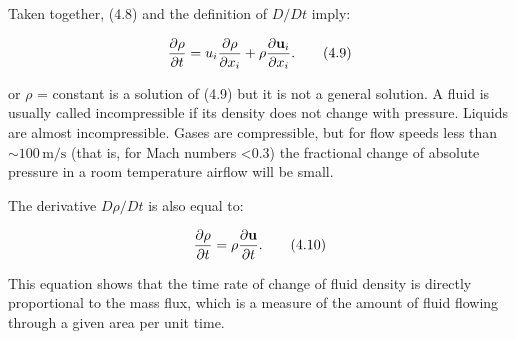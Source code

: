 \documentclass{article}
\begin{document}
Taken together, (4.8) and the definition of $D/Dt$ imply:

\[
\frac{\partial\rho}{\partial t} = u_i \frac{\partial\rho}{\partial x_i} + \rho \frac{\partial {\bf u}_i}{\partial x_i}. \tag{4.9}
\]

or $\rho$ = constant is a solution of (4.9) but it is not a general solution. A fluid is usually called incompressible if its density does not change with pressure. Liquids are almost incompressible. Gases are compressible, but for flow speeds less than $\sim\! 100 \, \mathrm{m/s}$ (that is, for Mach numbers <0.3) the fractional change of absolute pressure in a room temperature airflow will be small.

The derivative $D\rho/Dt$ is also equal to:

\[
\frac{\partial\rho}{\partial t} = \rho \frac{\partial {\bf u}}{\partial t}. \tag{4.10}
\]

This equation shows that the time rate of change of fluid density is directly proportional to the mass flux, which is a measure of the amount of fluid flowing through a given area per unit time.
\end{document}
